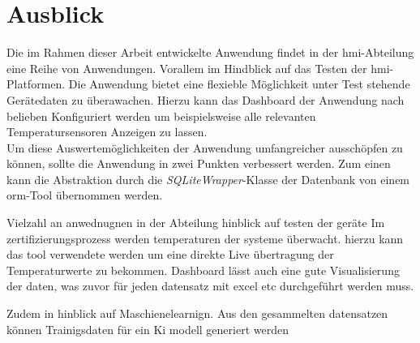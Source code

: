 \chapter{Ausblick}
Die im Rahmen dieser Arbeit entwickelte Anwendung findet in der \ac{hmi}-Abteilung eine Reihe von Anwendungen. Vorallem im Hindblick auf das Testen der \ac{hmi}-Platformen. Die Anwendung bietet eine flexieble Möglichkeit unter Test stehende Gerätedaten zu überawachen. Hierzu kann das Dashboard der Anwendung nach belieben Konfiguriert werden um beispielsweise alle relevanten Temperatursensoren Anzeigen zu lassen.\\
Um diese Auswertemöglichkeiten der Anwendung umfangreicher ausschöpfen zu können, sollte die Anwendung in zwei Punkten verbessert werden. Zum einen kann die Abstraktion durch die \textit{SQLiteWrapper}-Klasse der Datenbank von einem \ac{orm}-Tool übernommen werden. 


Vielzahl an anwednugnen in der Abteilung
hinblick auf testen der geräte
Im zertifizierungsprozess werden temperaturen der systeme überwacht. 
hierzu kann das tool verwendete werden um eine direkte Live übertragung der Temperaturwerte zu bekommen.
Dashboard lässt auch eine gute Visualisierung der daten, was zuvor für jeden datensatz mit excel etc durchgeführt werden muss.

Zudem in hinblick auf Maschienelearnign. Aus den gesammelten datensatzen können Trainigsdaten für ein Ki modell generiert werden